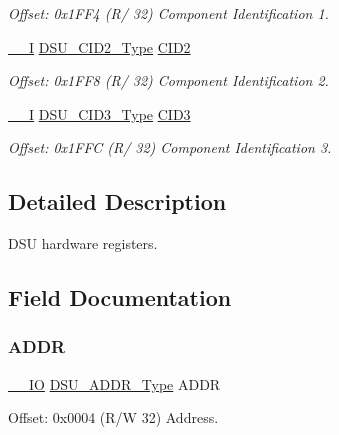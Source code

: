 \begin{DoxyCompactItemize}
\begin{DoxyCompactList}\small\item\em Offset\+: 0x1\+F\+F4 (R/ 32) Component Identification 1. \end{DoxyCompactList}\item 
\mbox{\hyperlink{core__cm0plus_8h_af63697ed9952cc71e1225efe205f6cd3}{\+\_\+\+\_\+I}} \mbox{\hyperlink{union_d_s_u___c_i_d2___type}{D\+S\+U\+\_\+\+C\+I\+D2\+\_\+\+Type}} \mbox{\hyperlink{struct_dsu_ab082e3d3bf264bc5403f0c11dde2fa5e}{C\+I\+D2}}
\begin{DoxyCompactList}\small\item\em Offset\+: 0x1\+F\+F8 (R/ 32) Component Identification 2. \end{DoxyCompactList}\item 
\mbox{\hyperlink{core__cm0plus_8h_af63697ed9952cc71e1225efe205f6cd3}{\+\_\+\+\_\+I}} \mbox{\hyperlink{union_d_s_u___c_i_d3___type}{D\+S\+U\+\_\+\+C\+I\+D3\+\_\+\+Type}} \mbox{\hyperlink{struct_dsu_a8c297f52f243379755caaea53904ec8c}{C\+I\+D3}}
\begin{DoxyCompactList}\small\item\em Offset\+: 0x1\+F\+FC (R/ 32) Component Identification 3. \end{DoxyCompactList}\end{DoxyCompactItemize}


\subsection{Detailed Description}
D\+SU hardware registers. 

\subsection{Field Documentation}
\mbox{\label{struct_dsu_a3663d6824eee85773d00a11395edd46d}} 
\subsubsection{\texorpdfstring{ADDR}{ADDR}}
{\footnotesize\ttfamily \mbox{\hyperlink{core__cm0plus_8h_aec43007d9998a0a0e01faede4133d6be}{\+\_\+\+\_\+\+IO}} \mbox{\hyperlink{union_d_s_u___a_d_d_r___type}{D\+S\+U\+\_\+\+A\+D\+D\+R\+\_\+\+Type}} A\+D\+DR}



Offset\+: 0x0004 (R/W 32) Address. 

